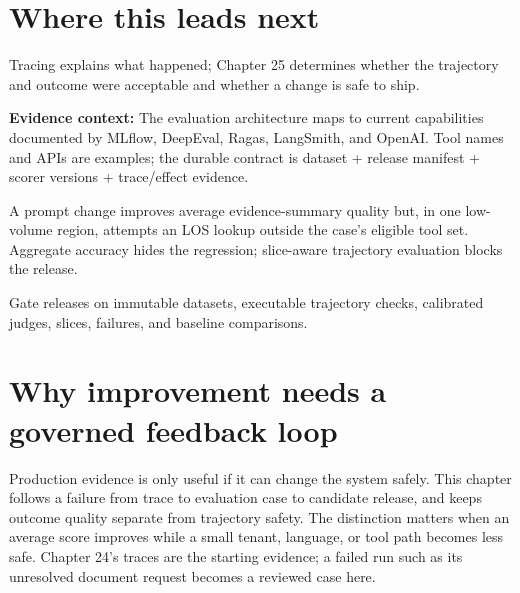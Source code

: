 \section{Where this leads next}

Tracing explains what happened; Chapter 25 determines whether the trajectory and outcome were acceptable and whether a change is safe to ship.\par



\begin{bookquote}

\textbf{Evidence context:} The evaluation architecture maps to current capabilities documented by MLflow, DeepEval, Ragas, LangSmith, and OpenAI. Tool names and APIs are examples; the durable contract is dataset + release manifest + scorer versions + trace/effect evidence. \textbf{}

\end{bookquote}

\begin{bookcallout}
A prompt change improves average evidence-summary quality but, in one low-volume region, attempts an LOS lookup outside the case's eligible tool set. Aggregate accuracy hides the regression; slice-aware trajectory evaluation blocks the release.
\end{bookcallout}

\begin{bookcallout}
Gate releases on immutable datasets, executable trajectory checks, calibrated judges, slices, failures, and baseline comparisons.
\end{bookcallout}

\section{Why improvement needs a governed feedback loop}

Production evidence is only useful if it can change the system safely. This chapter follows a failure from trace to evaluation case to candidate release, and keeps outcome quality separate from trajectory safety. The distinction matters when an average score improves while a small tenant, language, or tool path becomes less safe. Chapter 24's traces are the starting evidence; a failed run such as its unresolved document request becomes a reviewed case here.\par

